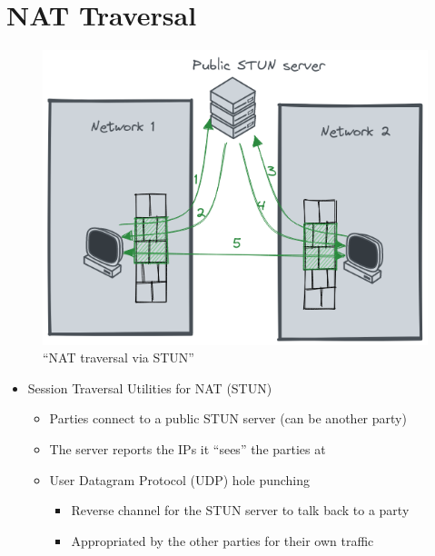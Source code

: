 \hypertarget{nat-traversal}{%
\chapter{NAT Traversal}\label{nat-traversal}}

\begin{figure}
\centering
\includegraphics[width=\textwidth,height=0.66\textheight]{presentation/../figures/nat-traversal.png}
\caption{``NAT traversal via STUN''\label{nat-traversal}}
\end{figure}

\begin{itemize}
\tightlist
\item
  Session Traversal Utilities for NAT (STUN)

  \begin{itemize}
  \tightlist
  \item
    Parties connect to a public STUN server (can be another party)
  \item
    The server reports the IPs it ``sees'' the parties at
  \item
    User Datagram Protocol (UDP) hole punching

    \begin{itemize}
    \tightlist
    \item
      Reverse channel for the STUN server to talk back to a party
    \item
      Appropriated by the other parties for their own traffic
    \end{itemize}
  \end{itemize}
\end{itemize}
